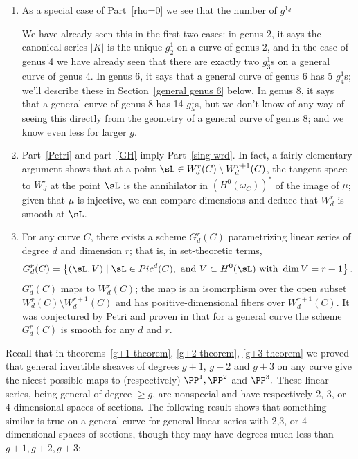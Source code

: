 \begin{remark}

\begin{enumerate}
 \item As a special case of Part~\ref{rho=0} we see that the number of $g^{1_{d}}$

We have already seen this in the first two cases: in genus 2, it says the canonical series $|K|$ is the unique $g^1_2$ on a curve of genus 2, and in the case of genus 4 we have already seen  that there are exactly two $g^1_3$s on a general curve of genus 4. In genus 6, it says that a general curve of genus 6 has 5 $g^1_4$s; we'll describe these in Section~\ref{general genus 6} below.  In genus 8, it says that a general curve of genus 8 has 14 $g^1_5$s, but we don't know of any way of seeing this directly from the geometry of a general curve of genus 8; and we know even less for larger $g$.

\item Part~\ref{Petri} and part~\ref{GH} imply Part~\ref{sing wrd}. In fact, a fairly elementary argument  shows that at a point $\sL  \in W^r_d(C) \setminus W^{r+1}_d(C)$, the tangent space to $W^r_d$ at the point $\sL $ is the annihilator
in $(H^0(\omega_C))^*$ of the image of $\mu$; given that $\mu$ is injective, we can compare dimensions and deduce that $W^r_d$ is smooth at $\sL $.

\item For any curve $C$, there exists a scheme $G^r_d(C)$ parametrizing linear series of degree $d$ and dimension $r$; that is, in set-theoretic terms,
$$
G^r_d(C) = \left\{ (\sL , V) \mid \sL  \in Pic^d(C), \text{ and } V \subset H^0(\sL ) \text{ with } \dim V = r+1 \right\}.
$$
$G^r_d(C)$ maps to $W^r_d(C)$; the map is an isomorphism over the open subset $W^r_d(C) \setminus W^{r+1}_d(C)$ and has positive-dimensional fibers over $W^{r+1}_d(C)$. It was conjectured
by Petri and proven in \cite{Gieseker-Petri} that for a general curve the scheme $G^r_d(C)$ is smooth for any $d$ and $r$.
\end{enumerate}
\end{remark}


Recall that  in theorems~\ref{g+1 theorem}, \ref{g+2 theorem}, \ref{g+3 theorem} we proved that
general invertible sheaves of degrees $g+1$, $g+2$ and $g+3$ on any curve
give the nicest possible maps to (respectively) $\PP^1, \PP^2$ and $\PP^3.$ These
linear series, being general of degree $\geq g$, are  nonspecial and have respectively
2, 3, or 4-dimensional spaces of sections. The following result shows that something
similar is true on a general curve for general linear series with 2,3, or 4-dimensional
spaces of sections, though they may have degrees much less than $g+1, g+2, g+3$:

